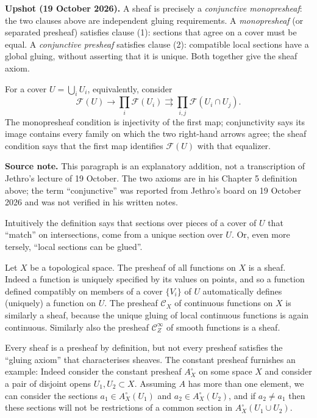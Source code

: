 \medskip\noindent
{\bf Upshot (19 October 2026).} A sheaf is precisely a
\emph{conjunctive monopresheaf}: the two clauses above are
independent gluing requirements. A \emph{monopresheaf}
(or separated presheaf) satisfies clause (1): sections
that agree on a cover must be equal. A \emph{conjunctive
presheaf} satisfies clause (2): compatible local sections
have a global gluing, without asserting that it is unique.
Both together give the sheaf axiom.

For a cover $U=\bigcup_i U_i$, equivalently, consider
\[
\mathcal F(U)\longrightarrow
\prod_i\mathcal F(U_i)
\rightrightarrows
\prod_{i,j}\mathcal F(U_i\cap U_j).
\]
The monopresheaf condition is injectivity of the first
map; conjunctivity says its image contains every family
on which the two right-hand arrows agree; the sheaf
condition says that the first map identifies $\mathcal F(U)$
with that equalizer.

\medskip\noindent
{\bf Source note.} This paragraph is an explanatory
addition, not a transcription of Jethro's lecture of
19 October. The two axioms are in his Chapter 5
definition above; the term ``conjunctive'' was reported from Jethro's board on
19 October 2026 and was not verified in his written notes.

Intuitively the definition says that sections over pieces of a cover of $U$ that “match” on
intersections, come from a unique section over $U$. Or, even more tersely, “local sections can
be glued”.

\begin{example}
Let $X$ be a topological space. The presheaf of all functions on $X$ is a sheaf.
Indeed a function is uniquely specified by its values on points, and so a function defined
compatibly on members of a cover $\{V_i\}$ of $U$ automatically defines (uniquely) a function on
$U$. The presheaf $\mathcal C_X$ of continuous functions on $X$ is similarly a sheaf, because the unique
gluing of local continuous functions is again continuous. Similarly also the presheaf
$\mathcal C^\infty_Z$ of smooth functions is a sheaf.
\end{example}

Every sheaf is a presheaf by definition, but not every presheaf satisfies the “gluing axiom”
that characterises sheaves. The constant presheaf furnishes an example: Indeed consider the
constant presheaf $A^\circ_X$ on some space $X$ and consider a pair of disjoint opens
$U_1,U_2\subset X$. Assuming $A$ has more than one element, we can consider the sections
$a_1\in A^\circ_X(U_1)$ and $a_2\in A^\circ_X(U_2)$, and if $a_2\neq a_1$ then these sections
will not be restrictions of a common section in $A^\circ_X(U_1\cup U_2)$.

